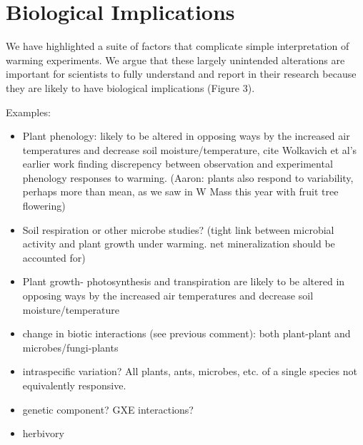 \documentclass{article}
\begin{document}
\section {Biological Implications}
\par We have highlighted a suite of factors that complicate simple interpretation of warming experiments. We argue that these largely unintended alterations are important for scientists to fully understand and report in their research because they are likely to have biological implications (Figure 3).
\par Examples:
\begin{itemize}
\item Plant phenology: likely to be altered in opposing ways by
the increased air temperatures and decrease soil moisture/temperature, cite Wolkavich et al's earlier work finding discrepency between observation and experimental phenology responses to warming. (Aaron: plants also respond to variability, perhaps more than mean, as we saw in W Mass this year with fruit tree flowering)
\item Soil respiration or other microbe studies? (tight link between microbial activity and plant growth under warming. net mineralization should be accounted for)
\item Plant growth- photosynthesis and transpiration are likely to be altered in opposing ways by the increased air temperatures and decrease soil moisture/temperature %
\item change in biotic interactions (see previous comment): both plant-plant and microbes/fungi-plants
\item intraspecific variation? All plants, ants, microbes, etc. of a single species not equivalently responsive. 

\item genetic component? GXE interactions?
\item herbivory
\end{itemize}
\end{document}
